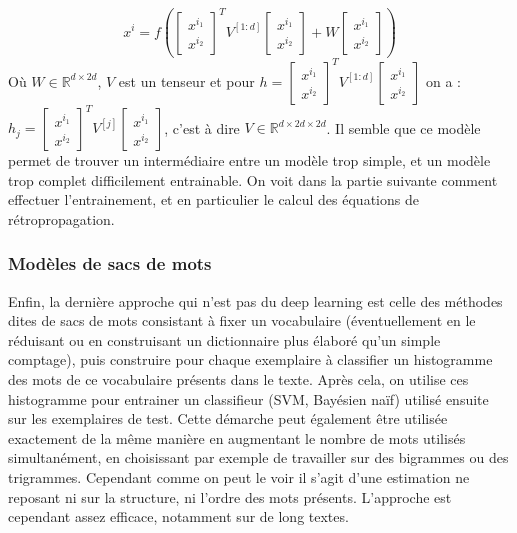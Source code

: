 \documentclass[conference]{IEEEtran}
\begin{document}
$$x^i=f\left(\begin{bmatrix} x^{i_1} \\ x^{i_2} \end{bmatrix}^T V^{[1:d]}\begin{bmatrix} x^{i_1} \\ x^{i_2} \end{bmatrix} + W\begin{bmatrix} x^{i_1} \\ x^{i_2} \end{bmatrix}\right)$$
Où $W\in\mathbb{R}^{d\times 2d}$, $V$ est un tenseur et pour $h=\begin{bmatrix} x^{i_1} \\ x^{i_2} \end{bmatrix}^T V^{[1:d]}\begin{bmatrix} x^{i_1} \\ x^{i_2} \end{bmatrix}$ on a : $h_j=\begin{bmatrix} x^{i_1} \\ x^{i_2} \end{bmatrix}^T V^{[j]}\begin{bmatrix} x^{i_1} \\ x^{i_2} \end{bmatrix}$, c'est à dire $V\in\mathbb{R}^{d\times 2d\times 2d}$. Il semble que ce modèle permet de trouver un intermédiaire entre un modèle trop simple, et un modèle trop complet difficilement entrainable. On voit dans la partie suivante comment effectuer l'entrainement, et en particulier le calcul des équations de rétropropagation.

\subsubsection{Modèles de sacs de mots}
Enfin, la dernière approche qui n'est pas du deep learning est celle des méthodes dites de sacs de mots consistant à fixer un vocabulaire (éventuellement en le réduisant ou en construisant un dictionnaire plus élaboré qu'un simple comptage), puis construire pour chaque exemplaire à classifier un histogramme des mots de ce vocabulaire présents dans le texte. Après cela, on utilise ces histogramme pour entrainer un classifieur (SVM, Bayésien naïf) utilisé ensuite sur les exemplaires de test. Cette démarche peut également être utilisée exactement de la même manière en augmentant le nombre de mots utilisés simultanément, en choisissant par exemple de travailler sur des bigrammes ou des trigrammes. Cependant comme on peut le voir il s'agit d'une estimation ne reposant ni sur la structure, ni l'ordre des mots présents. L'approche est cependant assez efficace, notamment sur de long textes.
\end{document}
